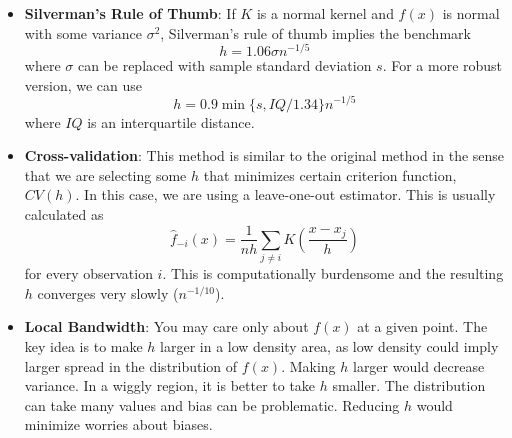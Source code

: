 \documentclass[12pt]{article}
\theoremstyle{definition}
\theoremstyle{property}
\theoremstyle{assumption}
\theoremstyle{example}
\theoremstyle{comment}
\begin{document}
 \begin{itemize}
 \item\textbf{Silverman's Rule of Thumb}: If $K$ is a normal kernel and $f(x)$ is normal with some variance $\sigma^2$, Silverman's rule of thumb implies the benchmark
 \[
 h=1.06\sigma n^{-1/5}
 \]
 where $\sigma$ can be replaced with sample standard deviation $s$. For a more robust version, we can use
 \[
 h=0.9 \min\{s,IQ/1.34\}n^{-1/5}
 \]
 where $IQ$ is an interquartile distance. 
 \item\textbf{Cross-validation}: This method is similar to the original method in the sense that we are selecting some $h$ that minimizes certain criterion function, $CV(h)$. In this case, we are using a leave-one-out estimator. This is usually calculated as
 \[
 \hat{f}_{-i}(x) = \frac{1}{nh}\sum_{j\neq i}K\left(\frac{x-x_j}{h}\right)
 \]
 for every observation $i$. This is computationally burdensome and the resulting $h$ converges very slowly ($n^{-1/10}$). 
  \item\textbf{Local Bandwidth}: You may care only about $f(x)$ at a given point. The key idea is to make $h$ larger in a low density area, as low density could imply larger spread in the distribution of $f(x)$. Making $h$ larger would decrease variance. In a wiggly region, it is better to take $h$ smaller. The distribution can take many values and bias can be problematic. Reducing $h$ would minimize worries about biases. 
 \end{itemize}
\end{document}

